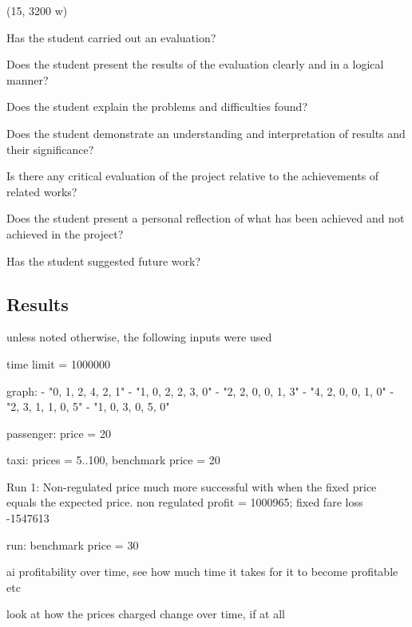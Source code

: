 (15, 3200 w)

Has the student carried out an evaluation?

Does the student present the results of the evaluation clearly and in a logical
manner?

Does the student explain the problems and difficulties found?

Does the student demonstrate an understanding and interpretation of results and
their significance?

Is there any critical evaluation of the project relative to the achievements of
related works?

Does the student present a personal reflection of what has been achieved and
not achieved in the project?

Has the student suggested future work?


\subsection{Results}
unless noted otherwise, the following inputs were used
 
time limit = 1000000

graph:
  - "0, 1, 2, 4, 2, 1"
  - "1, 0, 2, 2, 3, 0"
  - "2, 2, 0, 0, 1, 3"
  - "4, 2, 0, 0, 1, 0"
  - "2, 3, 1, 1, 0, 5"
  - "1, 0, 3, 0, 5, 0"

passenger: price = 20

taxi: prices = 5..100, benchmark price = 20

Run 1: Non-regulated price much more successful with when the fixed price
equals the expected price. non regulated profit = 1000965; fixed fare loss
-1547613


run: benchmark price = 30







ai profitability over time, see how much time it takes for it to become
profitable etc

look at how the prices charged change over time, if at all
